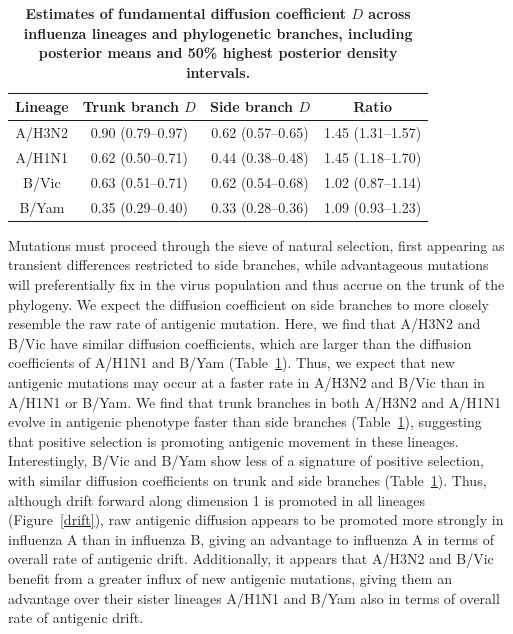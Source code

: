 \documentclass[11pt,oneside,letterpaper]{article}
\begin{document}
\begin{table}[h]
	\centering
	\caption{\textbf{Estimates of fundamental diffusion coefficient $D$ across influenza lineages and phylogenetic branches, including posterior means and 50\% highest posterior density intervals.}}
	\label{diffusiontable}	
	\begin{tabular}{ c c c c } 
	\hline
	Lineage	&	Trunk branch $D$ 	& 	Side branch $D$		& 	Ratio \\
	\hline		
	A/H3N2	&	0.90 (0.79--0.97)	&	0.62 (0.57--0.65)	&	1.45 (1.31--1.57) \\
	A/H1N1	&	0.62 (0.50--0.71)	&	0.44 (0.38--0.48)	&	1.45 (1.18--1.70) \\
	B/Vic	&	0.63 (0.51--0.71)	&	0.62 (0.54--0.68)	&	1.02 (0.87--1.14) \\
	B/Yam	&	0.35 (0.29--0.40)	&	0.33 (0.28--0.36)	&	1.09 (0.93--1.23) \\
	\hline
	\end{tabular}	
\end{table}

Mutations must proceed through the sieve of natural selection, first appearing as transient differences restricted to side branches, while advantageous mutations will preferentially fix in the virus population and thus accrue on the trunk of the phylogeny.
We expect the diffusion coefficient on side branches to more closely resemble the raw rate of antigenic mutation.
Here, we find that A/H3N2 and B/Vic have similar diffusion coefficients, which are larger than the diffusion coefficients of A/H1N1 and B/Yam (Table~\ref{diffusiontable}).
Thus, we expect that new antigenic mutations may occur at a faster rate in A/H3N2 and B/Vic than in A/H1N1 or B/Yam.
We find that trunk branches in both A/H3N2 and A/H1N1 evolve in antigenic phenotype faster than side branches (Table~\ref{diffusiontable}), suggesting that positive selection is promoting antigenic movement in these lineages.
Interestingly, B/Vic and B/Yam show less of a signature of positive selection, with similar diffusion coefficients on trunk and side branches (Table~\ref{diffusiontable}).
Thus, although drift forward along dimension 1 is promoted in all lineages (Figure~\ref{drift}), raw antigenic diffusion appears to be promoted more strongly in influenza A than in influenza B, giving an advantage to influenza A in terms of overall rate of antigenic drift.
Additionally, it appears that A/H3N2 and B/Vic benefit from a greater influx of new antigenic mutations, giving them an advantage over their sister lineages A/H1N1 and B/Yam also in terms of overall rate of antigenic drift.
\end{document}
